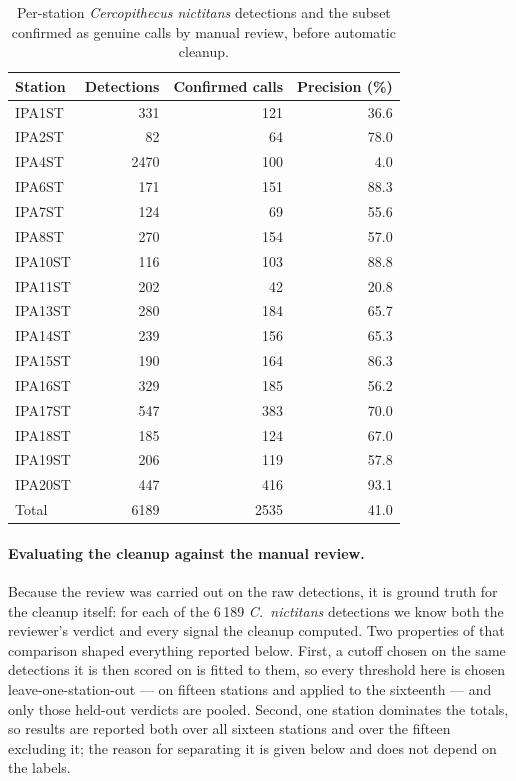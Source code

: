 \documentclass[review,3p,times]{elsarticle}
\begin{document}
\begin{table}[H]
\centering
\caption{Per-station \textit{Cercopithecus nictitans} detections and the
subset confirmed as genuine calls by manual review, before automatic cleanup.}
\label{tab:field}
\begin{tabular}{lrrr}
\toprule
Station & Detections & Confirmed calls & Precision (\%) \\
\midrule
IPA1ST  &  331 & 121 & 36.6 \\
IPA2ST  &   82 &  64 & 78.0 \\
IPA4ST  & 2470 & 100 &  4.0 \\
IPA6ST  &  171 & 151 & 88.3 \\
IPA7ST  &  124 &  69 & 55.6 \\
IPA8ST  &  270 & 154 & 57.0 \\
IPA10ST &  116 & 103 & 88.8 \\
IPA11ST &  202 &  42 & 20.8 \\
IPA13ST &  280 & 184 & 65.7 \\
IPA14ST &  239 & 156 & 65.3 \\
IPA15ST &  190 & 164 & 86.3 \\
IPA16ST &  329 & 185 & 56.2 \\
IPA17ST &  547 & 383 & 70.0 \\
IPA18ST &  185 & 124 & 67.0 \\
IPA19ST &  206 & 119 & 57.8 \\
IPA20ST &  447 & 416 & 93.1 \\
\midrule
Total   & 6189 & 2535 & 41.0 \\
\bottomrule
\end{tabular}
\end{table}

\paragraph{Evaluating the cleanup against the manual review.}
Because the review was carried out on the raw detections, it is ground truth
for the cleanup itself: for each of the 6\,189 \textit{C.\ nictitans} detections
we know both the reviewer's verdict and every signal the cleanup computed. Two
properties of that comparison shaped everything reported below. First, a cutoff
chosen on the same detections it is then scored on is fitted to them, so every
threshold here is chosen leave-one-station-out --- on fifteen stations and
applied to the sixteenth --- and only those held-out verdicts are pooled.
Second, one station dominates the totals, so results are reported both over all
sixteen stations and over the fifteen excluding it; the reason for separating
it is given below and does not depend on the labels.
\end{document}
